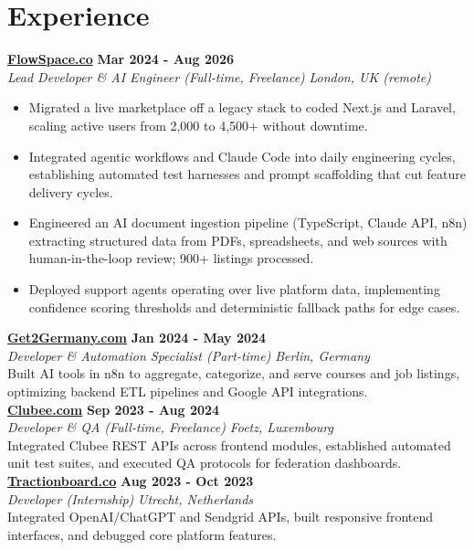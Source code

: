 \documentclass[a4paper,10pt]{article}
\newcommand{\role}[4]{%
 \textbf{#1} \hfill \textbf{#2}\\[1pt]%
 \textit{#3} \hfill \textit{#4}\\[2pt]%
}
\begin{document}
\section{Experience}

\role{\href{https://flowspace.co}{FlowSpace.co}}{Mar 2024 - Aug 2026}{Lead Developer \& AI Engineer (Full-time, Freelance)}{London, UK (remote)}
\begin{itemize}
 \item Migrated a live marketplace off a legacy stack to coded Next.js and Laravel, scaling active users from 2,000 to 4,500+ without downtime.
 \item Integrated agentic workflows and Claude Code into daily engineering cycles, establishing automated test harnesses and prompt scaffolding that cut feature delivery cycles.
 \item Engineered an AI document ingestion pipeline (TypeScript, Claude API, n8n) extracting structured data from PDFs, spreadsheets, and web sources with human-in-the-loop review; 900+ listings processed.
 \item Deployed support agents operating over live platform data, implementing confidence scoring thresholds and deterministic fallback paths for edge cases.
\end{itemize}

\role{\href{https://get2germany.com}{Get2Germany.com}}{Jan 2024 - May 2024}{Developer \& Automation Specialist (Part-time)}{Berlin, Germany}
Built AI tools in n8n to aggregate, categorize, and serve courses and job listings, optimizing backend ETL pipelines and Google API integrations.\\[1pt]

\role{\href{https://clubee.com}{Clubee.com}}{Sep 2023 - Aug 2024}{Developer \& QA (Full-time, Freelance)}{Foetz, Luxembourg}
Integrated Clubee REST APIs across frontend modules, established automated unit test suites, and executed QA protocols for federation dashboards.\\[1pt]

\role{\href{https://tractionboard.co}{Tractionboard.co}}{Aug 2023 - Oct 2023}{Developer (Internship)}{Utrecht, Netherlands}
Integrated OpenAI/ChatGPT and Sendgrid APIs, built responsive frontend interfaces, and debugged core platform features.

\end{document}
